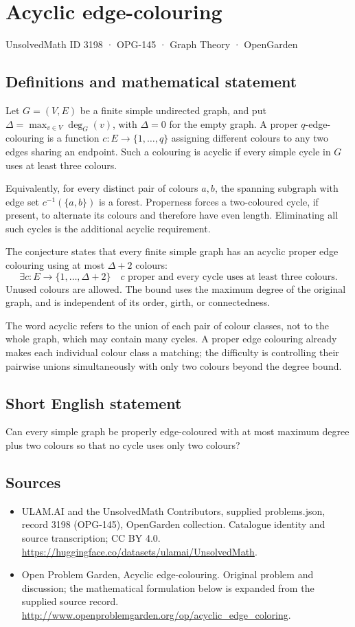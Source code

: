 \documentclass[11pt,a4paper]{article}
\begin{document}
\section*{Acyclic edge-colouring}\label{3198}
{\small UnsolvedMath ID 3198 · OPG-145 · Graph Theory · OpenGarden}
\subsection{Definitions and mathematical statement}
Let $G=(V,E)$ be a finite simple undirected graph,
and put $\Delta=\max_{v\in V}\deg_G(v)$, with
$\Delta=0$ for the empty graph. A proper
$q$-edge-colouring is a function
$c:E\to\{1,\ldots,q\}$ assigning different
colours to any two edges sharing an endpoint.
Such a colouring is acyclic if every simple
cycle in $G$ uses at least three colours.

Equivalently, for every distinct pair of
colours $a,b$, the spanning subgraph with
edge set $c^{-1}(\{a,b\})$ is a forest.
Properness forces a two-coloured cycle,
if present, to alternate its colours and
therefore have even length. Eliminating
all such cycles is the additional acyclic
requirement.

The conjecture states that every finite
simple graph has an acyclic proper edge
colouring using at most $\Delta+2$ colours:
\[
 \exists c:E\to\{1,\ldots,\Delta+2\}
 \quad c\text{ proper and every cycle uses at least three colours}.
\]
Unused colours are allowed. The bound uses
the maximum degree of the original graph,
and is independent of its order, girth,
or connectedness.

The word acyclic refers to the union of
each pair of colour classes, not to the
whole graph, which may contain many cycles.
A proper edge colouring already makes
each individual colour class a matching;
the difficulty is controlling their pairwise
unions simultaneously with only two colours
beyond the degree bound.
\subsection{Short English statement}
Can every simple graph be properly edge-coloured with at most maximum degree plus two colours so that no cycle uses only two colours?
\subsection{Sources}
\begin{itemize}
\item[S1] ULAM.AI and the UnsolvedMath Contributors, supplied problems.json, record 3198 (OPG-145), OpenGarden collection. Catalogue identity and source transcription; CC BY 4.0.
\url{https://huggingface.co/datasets/ulamai/UnsolvedMath}.
\item[S2] Open Problem Garden, Acyclic edge-colouring. Original problem and discussion; the mathematical formulation below is expanded from the supplied source record.
\url{http://www.openproblemgarden.org/op/acyclic_edge_coloring}.
\end{itemize}
\end{document}
